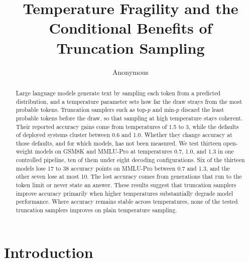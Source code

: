 \documentclass[10pt]{article}
\title{Temperature Fragility and the Conditional Benefits of\\ Truncation Sampling}
\author{\name Anonymous}
\begin{document}
\maketitle

\begin{abstract}
Large language models generate text by sampling each token from a predicted distribution, and a
temperature parameter sets how far the draw strays from the most probable tokens. Truncation
samplers such as top-$p$ and min-$p$ discard the least probable tokens before the draw, so that
sampling at high temperature stays coherent. Their reported accuracy gains come from temperatures
of 1.5 to 3, while the defaults of deployed systems cluster between 0.6 and 1.0. Whether they change
accuracy at those defaults, and for which models, has not been measured. We test thirteen open-weight
models on GSM8K and MMLU-Pro at temperatures 0.7, 1.0, and 1.3 in one controlled pipeline, ten
of them under eight decoding configurations. Six of the thirteen models lose 17 to 38 accuracy
points on MMLU-Pro between 0.7 and 1.3, and the other seven lose at most 10. The lost accuracy
comes from generations that run to the token limit or never state an answer. These results suggest
that truncation samplers improve accuracy primarily when higher temperatures substantially degrade
model performance. Where accuracy remains stable across temperatures, none of the tested
truncation samplers improves on plain temperature sampling.
\end{abstract}

\section{Introduction}
\label{sec:intro}
\end{document}
